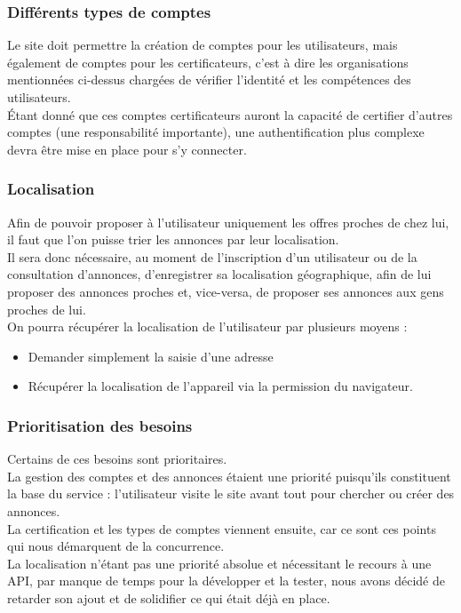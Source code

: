\documentclass[a4paper,11pt]{article}
\begin{document}
\subsubsection{Différents types de comptes}

Le site doit permettre la création de comptes pour les utilisateurs, mais également de comptes
pour les certificateurs, c'est à dire les organisations mentionnées ci-dessus chargées de vérifier l'identité et les compétences des utilisateurs.\\

Étant donné que ces comptes certificateurs auront la capacité de certifier d'autres comptes (une responsabilité importante), une authentification plus complexe devra être mise en place pour s'y connecter.\\

\subsubsection{Localisation}

Afin de pouvoir proposer à l'utilisateur uniquement les offres proches de chez lui, il faut que l'on
puisse trier les annonces par leur localisation.\\

Il sera donc nécessaire, au moment de l'inscription d'un utilisateur ou de la consultation d'annonces, d'enregistrer sa localisation
géographique, afin de lui proposer des annonces proches et, vice-versa, de proposer ses annonces aux gens proches de lui.\\

On pourra récupérer la localisation de l'utilisateur par plusieurs moyens :\\
\begin{itemize}
  \item Demander simplement la saisie d'une adresse
  \item Récupérer la localisation de l'appareil via la permission du navigateur.
\end{itemize}

\subsubsection{Prioritisation des besoins}

Certains de ces besoins sont prioritaires.\\
La gestion des comptes et des annonces étaient une priorité puisqu'ils constituent la base du service : l'utilisateur visite le site avant tout pour chercher ou créer des annonces.\\
La certification et les types de comptes viennent ensuite, car ce sont ces points qui nous démarquent de la concurrence.\\
La localisation n'étant pas une priorité absolue et nécessitant le recours à une API, par manque de temps pour la développer et la tester, nous avons décidé de retarder son ajout et de solidifier ce qui était déjà en place.\\
\end{document}
